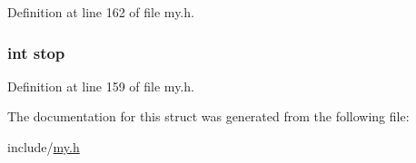 Definition at line 162 of file my.\+h.

\hypertarget{structs__getline_a6c0af9f2e97842405fb15ed952ef2976}{
\subsubsection[{stop}]{\setlength{\rightskip}{0pt plus 5cm}int stop}}\label{structs__getline_a6c0af9f2e97842405fb15ed952ef2976}


Definition at line 159 of file my.\+h.



The documentation for this struct was generated from the following file\+:\begin{DoxyCompactItemize}
\item 
include/\hyperlink{my_8h}{my.\+h}\end{DoxyCompactItemize}
